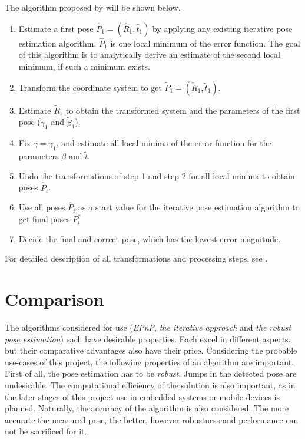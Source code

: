 The algorithm proposed by \cite{robust} will be shown below.
\begin{enumerate}
	\item Estimate a first pose $\hat{P}_1 = (\hat{R}_1, \hat{t}_1)$ by applying any existing iterative pose estimation algorithm. $\hat{P}_1$ is one local minimum of the error function. The goal of this algorithm is to analytically derive an estimate of the second local minimum, if such a minimum exists.
	\item Transform the coordinate system to get $\tilde{P}_1 = (\tilde{R}_1, \tilde{t}_1)$.
	\item Estimate $\tilde{R}_z$ to obtain the transformed system and the parameters of the first pose ($\tilde{\gamma}_1$ and $\tilde{\beta}_1$).
	\item Fix $\gamma = \tilde{\gamma}_1$, and estimate all local minima of the error function for the parameters $\beta$ and $\tilde{t}$.
	\item Undo the transformations of step 1 and step 2 for all local minima to obtain poses $\hat{P}_i$.
	\item Use all poses $\hat{P}_i$ as a start value for the iterative pose estimation algorithm to get final poses $P_i^*$
	\item Decide the final and correct pose, which has the lowest error magnitude.
\end{enumerate}

For detailed description of all transformations and processing steps, see \cite{robust}.

\section{Comparison}

The algorithms considered for use (\textit{EPnP}, \textit{the iterative approach} and \textit{the robust pose estimation}) each have desirable properties.
Each excel in different aspects, but their comparative advantages also have their price.
Considering the probable use-cases of this project, the following properties of an algorithm are important.
First of all, the pose estimation has to be \textit{robust}.
Jumps in the detected pose are undesirable.
The computational efficiency of the solution is also important, as in the later stages of this project use in embedded systems or mobile devices is planned.
Naturally, the accuracy of the algorithm is also considered.
The more accurate the measured pose, the better, however robustness and performance can not be sacrificed for it.

